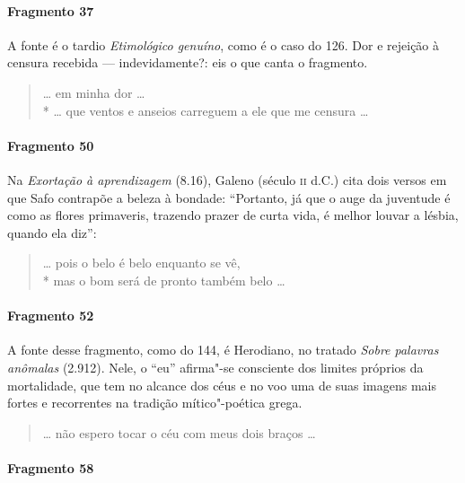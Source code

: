 \paragraph{Fragmento 37}

{\small A fonte é o tardio \textit{Etimológico genuíno}, como é o caso do 126. Dor e
rejeição à censura recebida --- indevidamente?: eis o que canta o fragmento.}

\begin{verse}
\ldots{} em minha dor \ldots{}\\*
\ldots{} que ventos e anseios carreguem a ele que me censura \ldots{}
\end{verse}

\paragraph{Fragmento 50}

{\small Na \textit{Exortação à aprendizagem} (8.16), Galeno (século \textsc{ii} d.C.) cita dois versos
em que Safo contrapõe a beleza à bondade: ``Portanto, já que o auge da
juventude é como as flores primaveris, trazendo prazer de curta vida, é melhor
louvar a lésbia, quando ela diz'':}

\begin{verse}
\ldots{} pois o belo é belo enquanto se vê,\\*
mas o bom será de pronto também belo \ldots{}
\end{verse}

\paragraph{Fragmento 52}

{\small A fonte desse fragmento, como do 144, é Herodiano, no tratado \textit{Sobre
palavras anômalas} (2.912). Nele, o “eu” afirma"-se consciente dos limites próprios da
mortalidade, que tem no alcance dos céus e no voo uma de suas imagens mais
fortes e recorrentes na tradição mítico"-poética grega.}

\begin{verse}
\ldots{} não espero tocar o céu com meus dois braços \ldots{}
\end{verse}

\paragraph{Fragmento 58}

